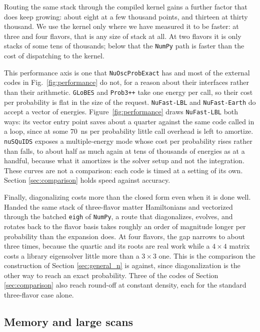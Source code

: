 \documentclass[final,5p,times,twocolumn,sort,compress]{elsarticle}
\newcommand{\fig}{Fig.}
\newcommand{\figu}[1]{\fig~\ref{fig:#1}}
\begin{document}
Routing the same stack through the compiled kernel gains a further factor that does keep growing: about eight at a few thousand points, and thirteen at thirty thousand.  We use the kernel only where we have measured it to be faster: at three and four flavors, that is any size of stack at all.  At two flavors it is only stacks of some tens of thousands; below that the {\tt NumPy} path is faster than the cost of dispatching to the kernel.

This performance axis is one that {\tt NuOscProbExact} has and most of the external codes in \figu{performance} do not, for a reason about their interfaces rather than their arithmetic.  {\tt GLoBES} and {\tt Prob3++} take one energy per call, so their cost per probability is flat in the size of the request.  {\tt NuFast-LBL} and {\tt NuFast-Earth} do accept a vector of energies.  Figure~\ref{fig:performance} draws {\tt NuFast-LBL} both ways: its vector entry point saves about a quarter against the same code called in a loop, since at some $70$~ns per probability little call overhead is left to amortize.  {\tt nuSQuIDS} exposes a multiple-energy mode whose cost per probability rises rather than falls, to about half as much again at tens of thousands of energies as at a handful, because what it amortizes is the solver setup and not the integration.  These curves are not a comparison: each code is timed at a setting of its own.  Section \ref{sec:comparison} holds speed against accuracy.

Finally, diagonalizing costs more than the closed form even when it is done well.  Handed the same stack of three-flavor matter Hamiltonians and vectorized through the batched {\tt eigh} of {\tt NumPy}, a route that diagonalizes, evolves, and rotates back to the flavor basis takes roughly an order of magnitude longer per probability than the expansion does.  At four flavors, the gap narrows to about three times, because the quartic and its roots are real work while a $4 \times 4$ matrix costs a library eigensolver little more than a $3 \times 3$ one.  This is the comparison the construction of Section \ref{sec:general_n} is against, since diagonalization is the other way to reach an exact probability.  Three of the codes of Section \ref{sec:comparison} also reach round-off at constant density, each for the standard three-flavor case alone.


\subsection{Memory and large scans}
\label{sec:memory}
\end{document}
